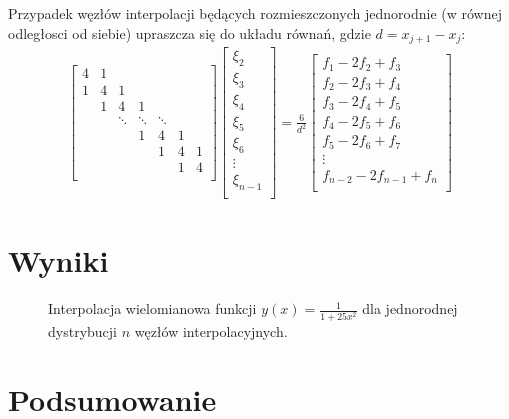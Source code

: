 \documentclass[11pt]{extarticle}
\begin{document}
	Przypadek węzłów interpolacji będących rozmieszczonych jednorodnie (w równej odległosci od siebie) upraszcza się do układu równań, gdzie \(d = x_{j+1} - x_j\):
	\begin{align}
		\begin{bmatrix}
			4 & 1 \\
			1 & 4 & 1 \\
			& 1 & 4 & 1 \\
			&& \ddots & \ddots & \ddots \\
			&&& 1 & 4 & 1 \\
			&&&& 1 & 4 & 1 \\
			&&&&& 1 & 4 \\
		\end{bmatrix}
		\begin{bmatrix}
			\xi_2 \\
			\xi_3 \\
			\xi_4 \\
			\xi_5 \\
			\xi_6 \\
			\vdots \\
			\xi_{n-1} \\
		\end{bmatrix} = \frac{6}{d^2} 
		\begin{bmatrix}
			f_1 - 2f_2 + f_3 \\
			f_2 - 2f_3 + f_4 \\
			f_3 - 2f_4 + f_5 \\
			f_4 - 2f_5 + f_6 \\
			f_5 - 2f_6 + f_7 \\
			\vdots \\
			f_{n-2} - 2f_{n-1} + f_{n} \\
		\end{bmatrix}
	\end{align}
	
	\clearpage
	\section{Wyniki}
	\begin{figure}[H]
		\begin{center}
			
		\end{center}
		\caption{Interpolacja wielomianowa funkcji \( y(x)=\frac{1}{1+25x^2} \) dla jednorodnej dystrybucji \(n\) węzłów interpolacyjnych.}
		\label{f1u}
	\end{figure}
	
	\clearpage
	\section{Podsumowanie}
	
\end{document}
